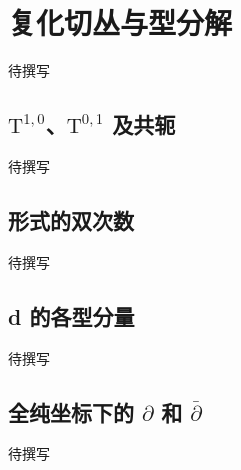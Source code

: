 
% 
% 

\section{复化切丛与型分解}
\label{g4:sec:1501}

待撰写

\subsection{\texorpdfstring{\(\mathrm{T}^{1,0}\)、\(\mathrm{T}^{0,1}\) 及共轭}{T¹⁰、T⁰¹ 及共轭}}
\label{g4:subsec:1501:01}
待撰写

\subsection{形式的双次数}
\label{g4:subsec:1501:02}
待撰写

\subsection{d 的各型分量}
\label{g4:subsec:1501:03}
待撰写

\subsection{\texorpdfstring{全纯坐标下的 \(\partial\) 和 \(\bar{\partial}\)}{全纯坐标下的 ∂ 和 \={∂}}}
\label{g4:subsec:1501:04}
待撰写
